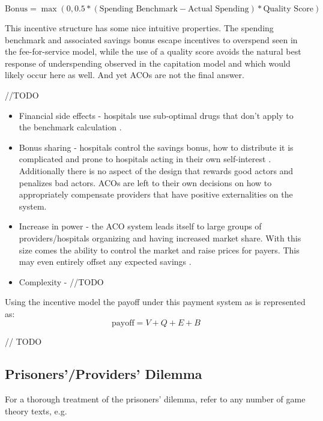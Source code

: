 \documentclass{article}
\begin{document}
\begin{equation}
    \text{Bonus} = \max (0, 0.5 * (\text{Spending Benchmark} - \text{Actual Spending}) * \text{Quality Score})
\end{equation}

This incentive structure has some nice intuitive properties. The spending benchmark and associated savings bonus escape incentives to overspend seen in the fee-for-service model, while the use of a quality score avoids the natural best response of underspending observed in the capitation model and which would likely occur here as well. And yet ACOs are not the final answer.

//TODO
\begin{itemize}
    \item Financial side effects - hospitals use sub-optimal drugs that don't apply to the benchmark calculation \cite{acoethics}.
    \item Bonus sharing - hospitals control the savings bonus, how to distribute it is complicated and prone to hospitals acting in their own self-interest \cite{inflation}. Additionally there is no aspect of the design that rewards good actors and penalizes bad actors. ACOs are left to their own decisions on how to appropriately compensate providers that have positive externalities on the system.
    \item Increase in power - the ACO system leads itself to large groups of providers/hospitals organizing and having increased market share. With this size comes the ability to control the market and raise prices for payers. This may even entirely offset any expected savings \cite{acoecon}.
    \item Complexity - //TODO
\end{itemize}

Using the incentive model the payoff under this payment system as is represented as:
\begin{equation}
    \text{payoff} = V + Q + E + B
\end{equation}

// TODO

\subsection*{Prisoners'/Providers' Dilemma}
For a thorough treatment of the prisoners' dilemma, refer to any number of game theory texts, e.g. \cite{networks}
\end{document}
